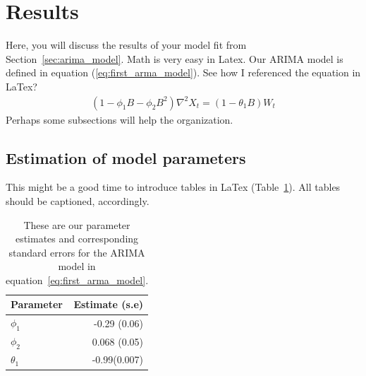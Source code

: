 \documentclass[a4paper]{article}
\begin{document}



\section{Results}\label{sec:results}
Here, you will discuss the results of your model fit from
Section~\ref{sec:arima_model}. 
%
Math is very easy in Latex. Our ARIMA
model is defined in equation (\ref{eq:first_arma_model}). See how I referenced the
equation in LaTex?
\begin{align}
	(1 - \phi_1 B - \phi_2B^2) \nabla^2 X_t = (1 - \theta_1 B)W_t
	\label{eq:first_arma_model}
\end{align}
Perhaps some subsections will help the organization.
%
\subsection{Estimation of model parameters }
This might be a good time to introduce tables
in LaTex (Table~\ref{tab:param_est}).
All tables should be captioned, accordingly.

\begin{table}[h!]
	\centering
	\begin{tabular}{l|r}
	  Parameter & Estimate (s.e) \\ \hline
	  $\phi_1$& -0.29 (0.06) \\
	  $\phi_2$ & 0.068 (0.05) \\
		$\theta_1$ & -0.99(0.007)
	\end{tabular}
	\caption{These are our parameter estimates and corresponding standard errors
	for the ARIMA model in
	equation~\ref{eq:first_arma_model}. }
	\label{tab:param_est}
\end{table}
\newpage
\end{document}
